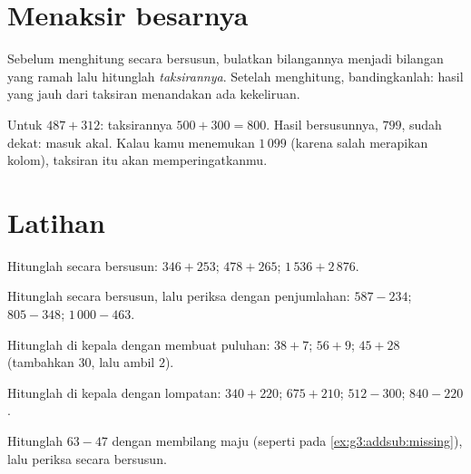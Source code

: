 \section{Menaksir besarnya}

\begin{method}\label{met:g3:addsub:estimate}
Sebelum menghitung secara bersusun, bulatkan bilangannya menjadi
bilangan yang ramah lalu hitunglah \emph{taksirannya}. Setelah
menghitung, bandingkanlah: hasil yang jauh dari taksiran menandakan
ada kekeliruan.
\end{method}

\begin{example}
Untuk $487 + 312$: taksirannya $500 + 300 = 800$. Hasil bersusunnya,
$799$, sudah dekat: masuk akal. Kalau kamu menemukan $1\,099$
(karena salah merapikan kolom), taksiran itu akan memperingatkanmu.
\end{example}

\section{Latihan}

\begin{exercise}[$\star$]\label{exo:g3:addsub:1}
Hitunglah secara bersusun: $346 + 253$; \quad $478 + 265$; \quad
$1\,536 + 2\,876$.
\end{exercise}

\begin{exercise}[$\star$]\label{exo:g3:addsub:2}
Hitunglah secara bersusun, lalu periksa dengan penjumlahan:
$587 - 234$; \quad $805 - 348$; \quad $1\,000 - 463$.
\end{exercise}

\begin{exercise}[$\star$]\label{exo:g3:addsub:3}
Hitunglah di kepala dengan membuat puluhan: $38 + 7$; \quad
$56 + 9$; \quad $45 + 28$ (tambahkan $30$, lalu ambil $2$).
\end{exercise}

\begin{exercise}[$\star$]\label{exo:g3:addsub:4}
Hitunglah di kepala dengan lompatan: $340 + 220$; \quad
$675 + 210$; \quad $512 - 300$; \quad $840 - 220$.
\end{exercise}

\begin{exercise}[$\star$]\label{exo:g3:addsub:5}
Hitunglah $63 - 47$ dengan membilang maju (seperti pada
\cref{ex:g3:addsub:missing}), lalu periksa secara bersusun.
\end{exercise}


